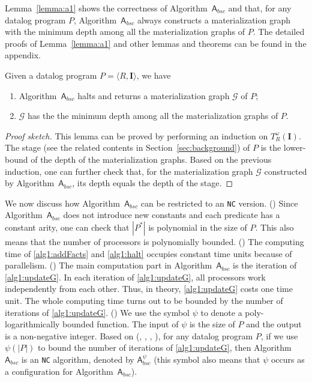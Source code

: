 \documentclass[final,1p,times]{elsarticle}
\begin{document}
Lemma~\ref{lemma:a1} shows the correctness of Algorithm~$\mathsf{A}_{bsc}$ and that, for any datalog program $P$,
Algorithm~$\mathsf{A}_{bsc}$ always constructs a materialization graph with the minimum depth among all the
materialization graphs of $P$. The detailed proofs of Lemma~\ref{lemma:a1} and other lemmas and theorems can be found
in the appendix.

\begin{lemma}
\label{lemma:a1}
Given a datalog program $P=\langle R, \textbf{I}\rangle$, we have
\begin{enumerate}[leftmargin=4ex]
\item Algorithm~$\mathsf{A}_{bsc}$ halts and returns a materialization graph $\mathcal{G}$ of $P$;
\item $\mathcal{G}$ has the the minimum depth among all the materialization graphs of $P$.
\end{enumerate}
\end{lemma}

\begin{proof}[Proof sketch] This lemma can be proved by performing
an induction on $T_R^{\omega}(\textbf{I})$.
The stage (see the related contents in Section~\ref{sec:background}) of $P$
is the lower-bound of the depth of the materialization graphs. Based on the previous induction,
one can further check that, for the materialization graph $\mathcal{G}$ constructed by Algorithm~$\mathsf{A}_{bsc}$,
its depth equals the depth of the stage.
\end{proof}

We now discuss how Algorithm~$\mathsf{A}_{bsc}$ can be restricted to an \texttt{NC} version.
(\uppercase\expandafter{}) Since Algorithm~$\mathsf{A}_{bsc}$ does not introduce
new constants and each predicate has a constant arity,
one can check that $|P^*|$ is polynomial in the size of $P$. This also means that
the number of processors is polynomially bounded.
(\uppercase\expandafter{}) The computing time of \ref{alg1:addFacts}
and \ref{alg1:halt} occupies constant time units because of parallelism.
(\uppercase\expandafter{}) The main computation part in Algorithm~$\mathsf{A}_{bsc}$ is the
iteration of \ref{alg1:updateG}.
In each iteration of \ref{alg1:updateG}, all processors work independently from each other.
Thus, in theory, \ref{alg1:updateG} costs one time unit.
The whole computing time turns out to be bounded by the number of iterations of \ref{alg1:updateG}. (\uppercase\expandafter{})
We use the symbol $\psi$ to denote a poly-logarithmically bounded function.
The input of $\psi$ is the size of $P$ and the output is a non-negative integer.
Based on (\uppercase\expandafter{}, \uppercase\expandafter{},
\uppercase\expandafter{}, \uppercase\expandafter{}),
for any datalog program $P$, if we use $\psi(|P|)$ to
bound the number of iterations of \ref{alg1:updateG}, then Algorithm~$\mathsf{A}_{bsc}$
is an \texttt{NC} algorithm, denoted by $\mathsf{A}_{bsc}^{\psi}$ (this symbol also
means that $\psi$ occurs as a configuration for Algorithm~$\mathsf{A}_{bsc}$).
\end{document}
